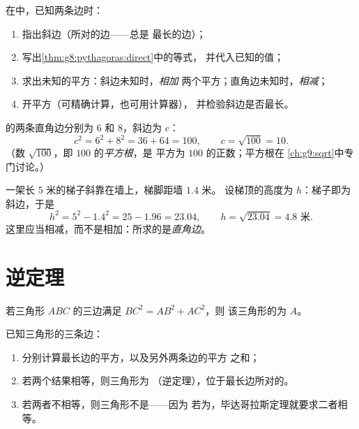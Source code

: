 \begin{method}[求边长]\label{met:g8:pythagoras:compute}
在中，已知两条边时：
\begin{enumerate}
  \item 指出斜边（所对的边——总是
        最长的边）；
  \item 写出\cref{thm:g8:pythagoras:direct}中的等式，
        并代入已知的值；
  \item 求出未知的平方：斜边未知时，\emph{相加}
        两个平方；直角边未知时，\emph{相减}；
  \item 开平方（可精确计算，也可用计算器），
        并检验斜边是否最长。
\end{enumerate}
\end{method}

\begin{example}[求斜边]\label{ex:g8:pythagoras:hypotenuse}
的两条直角边分别为 $6$ 和 $8$，斜边为 $c$：
\[
c^2 = 6^2 + 8^2 = 36 + 64 = 100,
\qquad
c = \sqrt{100} = 10 .
\]
（数 $\sqrt{100}$，即 $100$ 的\emph{平方根}，是
平方为 $100$ 的正数；平方根在
\cref{ch:g9:sqrt}中专门讨论。）
\end{example}

\begin{example}[求直角边]\label{ex:g8:pythagoras:leg}
一架长 $5$ 米的梯子斜靠在墙上，梯脚距墙 $1.4$ 米。
设梯顶的高度为 $h$：梯子即为斜边，于是
\[
h^2 = 5^2 - 1.4^2 = 25 - 1.96 = 23.04,
\qquad
h = \sqrt{23.04} = 4.8 \text{ 米}.
\]
这里应当相减，而不是相加：所求的是\emph{直角边}。
\end{example}

\section{逆定理}

\begin{theorem}[毕达哥拉斯定理的逆定理]\label{thm:g8:pythagoras:converse}
若三角形 $ABC$ 的三边满足 $BC^2 = AB^2 + AC^2$，则
该三角形的为 $A$。
\end{theorem}
\admitted

\begin{method}[判断直角三角形]\label{met:g8:pythagoras:test}
已知三角形的三条边：
\begin{enumerate}
  \item 分别计算最长边的平方，以及另外两条边的平方
        之和；
  \item 若两个结果相等，则三角形为
        （逆定理），位于最长边所对的。
  \item 若两者不相等，则三角形不是——因为
        若为，毕达哥拉斯定理就要求二者相等。
\end{enumerate}
\end{method}

